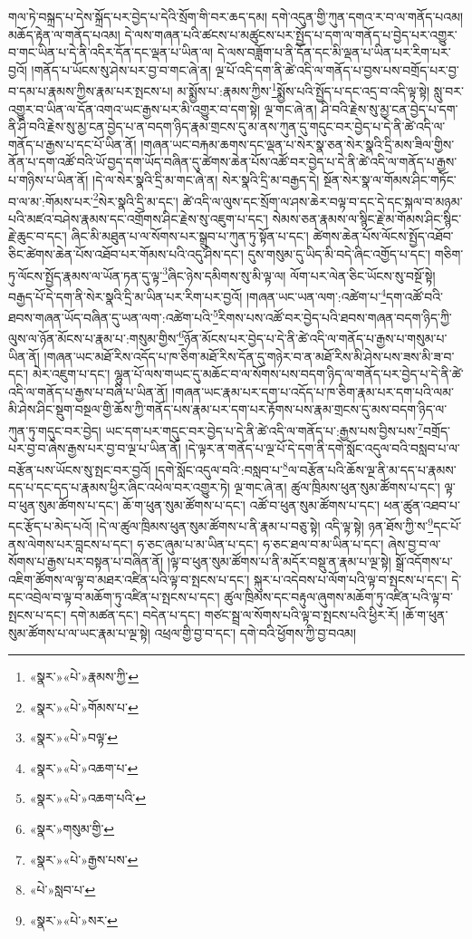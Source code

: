 གལ་ཏེ་བསྐྲད་པ་དེས་སྐྲོད་པར་བྱེད་པ་དེའི་སྲོག་གི་བར་ཆད་དམ། དགེ་འདུན་གྱི་ཀུན་དགའ་ར་བ་ལ་གནོད་པའམ། མཆོད་རྟེན་ལ་གནོད་པའམ། དེ་ལས་གཞན་པའི་ཚངས་པ་མཚུངས་པར་སྤྱོད་པ་དག་ལ་གནོད་པ་བྱེད་པར་འགྱུར་བ་གང་ཡིན་པ་དེ་ནི་འདིར་དོན་དང་ལྡན་པ་ཡིན་ལ། དེ་ལས་བཟློག་པ་ནི་དོན་དང་མི་ལྡན་པ་ཡིན་པར་རིག་པར་བྱའོ། །གནོད་པ་ཡོངས་སུ་ཤེས་པར་བྱ་བ་གང་ཞེ་ན། ལྔ་པོ་འདི་དག་ནི་ཚེ་འདི་ལ་གནོད་པ་བྱས་པས་བགྲོད་པར་བྱ་བ་དམ་པ་རྣམས་ཀྱིས་རྣམ་པར་སྤངས་པ། མ་སྨྱོས་པ་:རྣམས་ཀྱིས་\footnote{«སྣར་»«པེ་»རྣམས་ཀྱི་}སྨྱོས་པའི་སྤྱོད་པ་དང་འདྲ་བ་འདི་ལྟ་སྟེ། སླུ་བར་འགྱུར་བ་ཡིན་ལ་དོན་འགའ་ཡང་རྒྱས་པར་མི་འགྱུར་བ་དག་སྟེ། ལྔ་གང་ཞེ་ན། ཤི་བའི་རྗེས་སུ་མྱ་ངན་བྱེད་པ་དག་ནི་ཤི་བའི་རྗེས་སུ་མྱ་ངན་བྱེད་པ་ན་བདག་ཉིད་རྣམ་གྲངས་དུ་མ་ནས་ཀུན་དུ་གདུང་བར་བྱེད་པ་དེ་ནི་ཚེ་འདི་ལ་གནོད་པ་རྒྱས་པ་དང་པོ་ཡིན་ནོ། །གཞན་ཡང་བརྐམ་ཆགས་དང་ལྡན་པ་སེར་སྣ་ཅན་སེར་སྣའི་དྲི་མས་ཟིལ་གྱིས་ནོན་པ་དག་འཚོ་བའི་ཡོ་བྱད་དག་ཡོད་བཞིན་དུ་ཚེགས་ཆེན་པོས་འཚོ་བར་བྱེད་པ་དེ་ནི་ཚེ་འདི་ལ་གནོད་པ་རྒྱས་པ་གཉིས་པ་ཡིན་ནོ། །དེ་ལ་སེར་སྣའི་དྲི་མ་གང་ཞེ་ན། སེར་སྣའི་དྲི་མ་བརྒྱད་དེ། སྔོན་སེར་སྣ་ལ་གོམས་ཤིང་གཏོང་བ་ལ་མ་:གོམས་པར་\footnote{«སྣར་»«པེ་»གོམས་པ་}སེར་སྣའི་དྲི་མ་དང་། ཚེ་འདི་ལ་ལུས་དང་སྲོག་ལ་ཤས་ཆེར་བལྟ་བ་དང་དེ་དང་སྐལ་བ་མཉམ་པའི་མཛའ་བཤེས་རྣམས་དང་འགྲོགས་ཤིང་རྗེས་སུ་འཇུག་པ་དང་། སེམས་ཅན་རྣམས་ལ་སྙིང་རྗེ་མ་གོམས་ཤིང་སྙིང་རྗེ་ཆུང་བ་དང་། ཞིང་མི་མཐུན་པ་ལ་སོགས་པར་སྒྲུབ་པ་ཀུན་ཏུ་སྟོན་པ་དང་། ཚེགས་ཆེན་པོས་ལོངས་སྤྱོད་འཐོབ་ཅིང་ཚེགས་ཆེན་པོས་འཐོབ་པར་གོམས་པའི་འདུ་ཤེས་དང་། དུས་གསུམ་དུ་ཡིད་མི་བདེ་ཞིང་འགྱོད་པ་དང་། གཅིག་ཏུ་ལོངས་སྤྱོད་རྣམས་ལ་ཡོན་ཏན་དུ་ལྟ་\footnote{«སྣར་»«པེ་»བལྟ་}ཞིང་ཉེས་དམིགས་སུ་མི་ལྟ་ལ། ལོག་པར་ལེན་ཅིང་ཡོངས་སུ་བསྔོ་སྟེ། བརྒྱད་པོ་དེ་དག་ནི་སེར་སྣའི་དྲི་མ་ཡིན་པར་རིག་པར་བྱའོ། །གཞན་ཡང་ཡན་ལག་:འཚེག་པ་\footnote{«སྣར་»«པེ་»འཆག་པ་}དག་འཚོ་བའི་ཐབས་གཞན་ཡོད་བཞིན་དུ་ཡན་ལག་:འཚེག་པའི་\footnote{«སྣར་»«པེ་»འཆག་པའི་}རིགས་པས་འཚོ་བར་བྱེད་པའི་ཐབས་གཞན་བདག་ཉིད་ཀྱི་ལུས་ལ་ཉོན་མོངས་པ་རྣམ་པ་:གསུམ་གྱིས་\footnote{«སྣར་»གསུམ་གྱི་}ཉོན་མོངས་པར་བྱེད་པ་དེ་ནི་ཚེ་འདི་ལ་གནོད་པ་རྒྱས་པ་གསུམ་པ་ཡིན་ནོ། །གཞན་ཡང་མཐོ་རིས་འདོད་པ་ཁ་ཅིག་མཐོ་རིས་དོན་དུ་གཉེར་བ་ན་མཐོ་རིས་མི་ཤེས་པས་ཟས་མི་ཟ་བ་དང་། མེར་འཇུག་པ་དང་། ལྷུན་པོ་ལས་གཡང་དུ་མཆོང་བ་ལ་སོགས་པས་བདག་ཉིད་ལ་གནོད་པར་བྱེད་པ་དེ་ནི་ཚེ་འདི་ལ་གནོད་པ་རྒྱས་པ་བཞི་པ་ཡིན་ནོ། །གཞན་ཡང་རྣམ་པར་དག་པ་འདོད་པ་ཁ་ཅིག་རྣམ་པར་དག་པའི་ལམ་མི་ཤེས་ཤིང་སྡུག་བསྔལ་གྱི་ཆོས་ཀྱི་གནོད་པས་རྣམ་པར་དག་པར་རྟོགས་པས་རྣམ་གྲངས་དུ་མས་བདག་ཉིད་ལ་ཀུན་ཏུ་གདུང་བར་བྱེད། ཡང་དག་པར་གདུང་བར་བྱེད་པ་དེ་ནི་ཚེ་འདི་ལ་གནོད་པ་:རྒྱས་པས་བྱིས་པས་\footnote{«སྣར་»«པེ་»རྒྱས་པས་}བགྲོད་པར་བྱ་བ་ཞེས་རྒྱས་པར་བྱ་བ་ལྔ་པ་ཡིན་ནོ། །དེ་ལྟར་ན་གནོད་པ་ལྔ་པོ་དེ་དག་ནི་དགེ་སློང་འདུལ་བའི་བསླབ་པ་ལ་བརྩོན་པས་ཡོངས་སུ་སྤང་བར་བྱའོ། །དགེ་སློང་འདུལ་བའི་:བསླབ་པ་\footnote{«པེ་»སླབ་པ་}ལ་བརྩོན་པའི་ཆོས་ལྔ་ནི་མ་དད་པ་རྣམས་དད་པ་དང་དད་པ་རྣམས་ཕྱིར་ཞིང་འཕེལ་བར་འགྱུར་ཏེ། ལྔ་གང་ཞེ་ན། ཚུལ་ཁྲིམས་ཕུན་སུམ་ཚོགས་པ་དང་། ལྟ་བ་ཕུན་སུམ་ཚོགས་པ་དང་། ཆོ་ག་ཕུན་སུམ་ཚོགས་པ་དང་། འཚོ་བ་ཕུན་སུམ་ཚོགས་པ་དང་། ཕན་ཚུན་འཐབ་པ་དང་རྩོད་པ་མེད་པའོ། །དེ་ལ་ཚུལ་ཁྲིམས་ཕུན་སུམ་ཚོགས་པ་ནི་རྣམ་པ་བཅུ་སྟེ། འདི་ལྟ་སྟེ། ཉན་ཐོས་ཀྱི་ས་\footnote{«སྣར་»«པེ་»སར་}དང་པོ་ནས་ལེགས་པར་བླངས་པ་དང་། ཧ་ཅང་ཞུམ་པ་མ་ཡིན་པ་དང་། ཧ་ཅང་ཐལ་བ་མ་ཡིན་པ་དང་། ཞེས་བྱ་བ་ལ་སོགས་པ་རྒྱས་པར་བསྟན་པ་བཞིན་ནོ། །ལྟ་བ་ཕུན་སུམ་ཚོགས་པ་ནི་མདོར་བསྡུ་ན་རྣམ་པ་ལྔ་སྟེ། སྒྲོ་འདོགས་པ་འཇིག་ཚོགས་ལ་ལྟ་བ་མཐར་འཛིན་པའི་ལྟ་བ་སྤངས་པ་དང་། སྐུར་པ་འདེབས་པ་ལོག་པའི་ལྟ་བ་སྤངས་པ་དང་། དེ་དང་འབྲེལ་བ་ལྟ་བ་མཆོག་ཏུ་འཛིན་པ་སྤངས་པ་དང་། ཚུལ་ཁྲིམས་དང་བརྟུལ་ཞུགས་མཆོག་ཏུ་འཛིན་པའི་ལྟ་བ་སྤངས་པ་དང་། དགེ་མཚན་དང་། བདེན་པ་དང་། གཙང་སྦྲ་ལ་སོགས་པའི་ལྟ་བ་སྤངས་པའི་ཕྱིར་རོ། །ཆོ་ག་ཕུན་སུམ་ཚོགས་པ་ལ་ཡང་རྣམ་པ་ལྔ་སྟེ། འཕྲལ་གྱི་བྱ་བ་དང་། དགེ་བའི་ཕྱོགས་ཀྱི་བྱ་བའམ། 